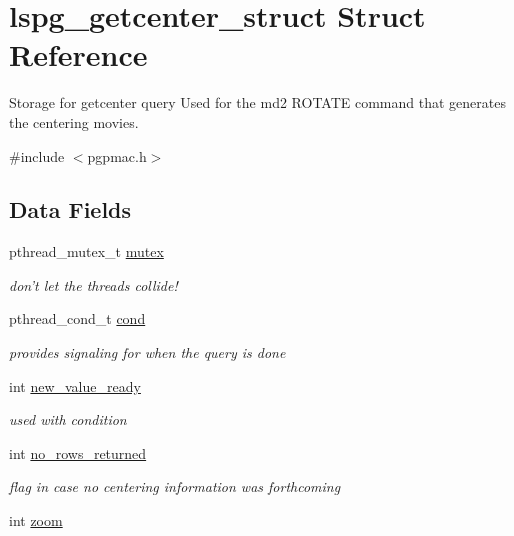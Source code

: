 \hypertarget{structlspg__getcenter__struct}{
\section{lspg\_\-getcenter\_\-struct Struct Reference}
\label{structlspg__getcenter__struct}
}


Storage for getcenter query Used for the md2 ROTATE command that generates the centering movies.  


{\ttfamily \#include $<$pgpmac.h$>$}\subsection*{Data Fields}
\begin{DoxyCompactItemize}
\item 
pthread\_\-mutex\_\-t \hyperlink{structlspg__getcenter__struct_a214bb7e88b137162f13f41f2c43002a9}{mutex}
\begin{DoxyCompactList}\small\item\em don't let the threads collide! \item\end{DoxyCompactList}\item 
pthread\_\-cond\_\-t \hyperlink{structlspg__getcenter__struct_ae0db0ff2608ab5ba3e7c1b4ad3fc0e91}{cond}
\begin{DoxyCompactList}\small\item\em provides signaling for when the query is done \item\end{DoxyCompactList}\item 
int \hyperlink{structlspg__getcenter__struct_a4b350f11f1e375b9e9e839caaffbcb6b}{new\_\-value\_\-ready}
\begin{DoxyCompactList}\small\item\em used with condition \item\end{DoxyCompactList}\item 
int \hyperlink{structlspg__getcenter__struct_aaeb0ccf4289b4fb306c2bc04ae85b237}{no\_\-rows\_\-returned}
\begin{DoxyCompactList}\small\item\em flag in case no centering information was forthcoming \item\end{DoxyCompactList}\item 
int \hyperlink{structlspg__getcenter__struct_a63e640a925611d2404a1529aea30a853}{zoom}

\end{DoxyCompactItemize}
